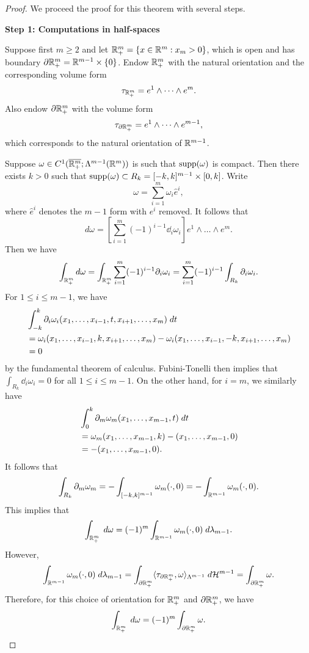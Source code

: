\documentclass[a4paper]{article}
\begin{document}
\begin{proof}
We proceed the proof for this theorem with several steps.

\textbf{Step 1: Computations in half-spaces}

Suppose first $m \geq 2$ and let
$\mathbb{R}^m_+ = \{x \in \mathbb{R}^m : x_m > 0\}$, which is open
and has boundary
$\partial \mathbb{R}^m_+ = \mathbb{R}^{m-1} \times \{0\}$. Endow $\mathbb{R}^m_+$ with
the natural orientation and the corresponding volume
form
\[
\tau_{\mathbb{R}^m_+} = e^1 \wedge \dots \wedge e^m.
\]
Also endow $\partial \mathbb{R}^m_+$ with the volume form
\[
\tau_{\partial \mathbb{R}^m_+} = e^1 \wedge \dots \wedge e^{m-1},
\]
which corresponds to the natural orientation of $\mathbb{R}^{m-1}$.

Suppose $\omega \in C^1 (\overline{\mathbb{R}^{m}_+} ; \Lambda^{m-1}
(\mathbb{R}^m))$ is such that $\operatorname{supp}(\omega)$ is compact.
Then there exists $k > 0$ such that $\operatorname{supp} (\omega)
\subset R_k = [-k, k]^{m-1} \times [0, k]$.
Write
\[
\omega = \sum_{i=1}^m \omega_i \hat{e}^i,
\]
where $\hat{e}^i$ denotes the $m-1$ form with $e^i$ removed.
It follows that
\[
d \omega = \left[ \sum_{i=1}^m (-1)^{i-1} \dd_i \omega_i
\right] e^1 \wedge \dots \wedge e^m.
\]
Then we have
\[
\int_{\mathbb{R}^m_+} d \omega =
\int_{\mathbb{R}^m_+} \sum_{i=1}^m (-1)^{i-1} \partial_i \omega_i
= \sum_{i=1}^m (-1)^{i-1} \int_{R_k} \partial_i \omega_i.
\]
For $1 \leq i \leq m - 1$, we have
\[
\begin{aligned}
  &\int_{-k}^k \partial_i \omega_i (x_1, \dots, x_{i-1},
  t, x_{i+1}, \dots, x_m) \; d t \\
  &= \omega_i (x_1, \dots, x_{i-1}, k, x_{i+1}, \dots, x_m)
  - \omega_i (x_1, \dots, x_{i-1}, -k, x_{i+1}, \dots, x_m) \\
  &= 0
\end{aligned}
\]
by the fundamental theorem of calculus.
Fubini-Tonelli then implies that $\int_{R_k} \dd_i \omega_i
= 0$ for all $1 \leq i \leq m - 1$. On the other hand,
for $i = m$, we similarly have
\[
\begin{aligned}
&\int_0^k \partial_m \omega_m (x_1, \dots, x_{m-1}, t) \; d t \\
&= \omega_m (x_1, \dots, x_{m-1}, k)
- (x_1, \dots, x_{m-1}, 0) \\
&= - (x_1, \dots, x_{m-1}, 0).
\end{aligned}
\]
It follows that
\[
\int_{R_k} \partial_m \omega_m
= - \int_{[-k, k]^{m-1}} \omega_m (\cdot, 0)
= - \int_{\mathbb{R}^{m-1}} \omega_m (\cdot, 0).
\]
This implies that
\[
\int_{\mathbb{R}^m_+} \; d \omega
= (-1)^m \int_{\mathbb{R}^{m-1}} \omega_m (\cdot, 0) \; d \lambda_{m-1}.
\]
However,
\[
\int_{\mathbb{R}^{m-1}} \omega_m (\cdot, 0) \; d \lambda_{m-1}
= \int_{\partial \mathbb{R}^m_+} \langle \tau_{\partial \mathbb{R}^m_+}, \omega
\rangle_{\Lambda^{m-1}}
\; d \mathcal{H}^{m-1}
= \int_{\partial \mathbb{R}^{m}_+} \omega.
\]
Therefore, for this choice of orientation for $\mathbb{R}^m_+$
and $\partial \mathbb{R}^m_+$, we have
\[
\int_{\mathbb{R}^m_+} \; d \omega = (-1)^m \int_{\partial \mathbb{R}^m_+} \omega.
\]


\end{proof}
\end{document}
